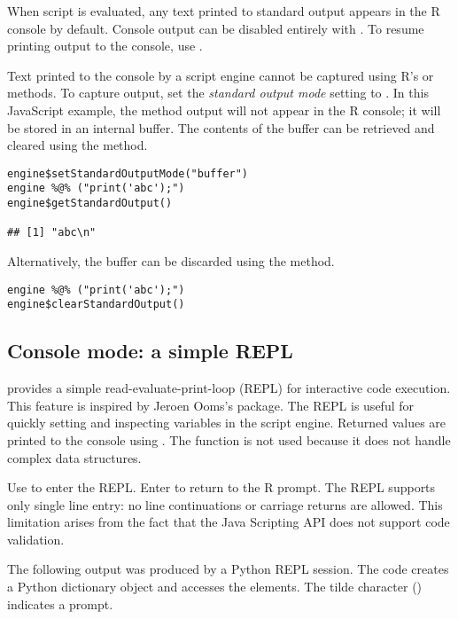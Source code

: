 When script is evaluated, any text printed to standard output appears in the R console by default. Console output can be disabled entirely with . To resume printing output to the console, use .

Text printed to the console by a script engine cannot be captured using R's  or  methods. To capture output, set the \textit{standard output mode} setting to . In this JavaScript example, the  method output will not appear in the R console; it will be stored in an internal buffer. The contents of the buffer can be retrieved and cleared using the  method.

\begin{verbatim}
engine$setStandardOutputMode("buffer")
engine %@% ("print('abc');")
engine$getStandardOutput()

## [1] "abc\n"
\end{verbatim}
Alternatively, the buffer can be discarded using the  method.
\begin{verbatim}
engine %@% ("print('abc');")
engine$clearStandardOutput()
\end{verbatim}

\subsection{Console mode: a simple REPL}

 provides a simple read-evaluate-print-loop (REPL) for interactive code execution. This feature is inspired by Jeroen Ooms's  package. The REPL is useful for quickly setting and inspecting variables in the script engine. Returned values are printed to the console using . The  function is not used because it does not handle complex data structures.

Use  to enter the REPL. Enter  to return to the R prompt. The REPL supports only single line entry: no line continuations or carriage returns are allowed. This limitation arises from the fact that the Java Scripting API does not support code validation.

The following output was produced by a Python REPL session. The code creates a Python dictionary object and accesses the elements. The tilde character (\samp{$\sim$}) indicates a prompt.

